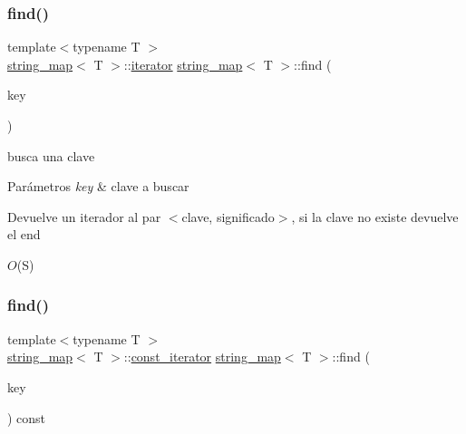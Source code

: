 \subsubsection{\texorpdfstring{find()}{find()}\hspace{0.1cm}{\footnotesize\ttfamily [1/2]}}
{\footnotesize\ttfamily template$<$typename T $>$ \\
\mbox{\hyperlink{classstring__map}{string\+\_\+map}}$<$ T $>$\+::\mbox{\hyperlink{classstring__map_1_1iterator}{iterator}} \mbox{\hyperlink{classstring__map}{string\+\_\+map}}$<$ T $>$\+::find (\begin{DoxyParamCaption}\item[{const key\+\_\+type \&}]{key }\end{DoxyParamCaption})}



busca una clave 


\begin{DoxyParams}{Parámetros}
{\em key} & clave a buscar \\
\hline
\end{DoxyParams}
\begin{DoxyReturn}{Devuelve}
un iterador al par $<$clave, significado$>$, si la clave no existe devuelve el end
\end{DoxyReturn}

\begin{DoxyDescription}
\item[Complejidad Temporal]$O$(S)
\end{DoxyDescription}\mbox{\label{classstring__map_a4542bfa7df12212f10a9bf7bf10d3804}} 
\subsubsection{\texorpdfstring{find()}{find()}\hspace{0.1cm}{\footnotesize\ttfamily [2/2]}}
{\footnotesize\ttfamily template$<$typename T $>$ \\
\mbox{\hyperlink{classstring__map}{string\+\_\+map}}$<$ T $>$\+::\mbox{\hyperlink{classstring__map_1_1const__iterator}{const\+\_\+iterator}} \mbox{\hyperlink{classstring__map}{string\+\_\+map}}$<$ T $>$\+::find (\begin{DoxyParamCaption}\item[{const key\+\_\+type \&}]{key }\end{DoxyParamCaption}) const}



